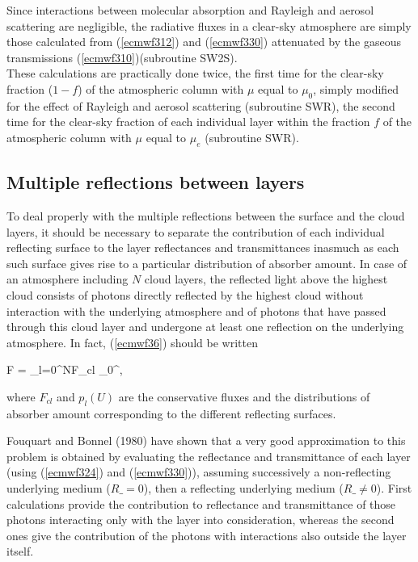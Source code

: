 Since interactions between molecular absorption and Rayleigh and aerosol
scattering are negligible, the radiative fluxes in a clear-sky atmosphere are
simply those calculated from (\ref{ecmwf312}) and (\ref{ecmwf330}) attenuated
by the gaseous transmissions (\ref{ecmwf310})(subroutine SW2S).\\

These calculations are practically done twice, the first time for the clear-sky
fraction ($1-f$) of the atmospheric column with $\mu$ equal to $\mu_0$, simply
modified for the effect of Rayleigh and aerosol scattering (subroutine SWR),
the second time for the clear-sky fraction of each individual layer within the
fraction $f$ of the atmospheric column with $\mu$ equal to $\mu_e$
(subroutine SWR).

%
\subsection{Multiple reflections between layers}
%


To deal properly with the multiple reflections between the surface and the
cloud layers, it should be necessary to separate the contribution of each
individual reflecting surface to the layer reflectances and transmittances
inasmuch as each such surface gives rise to a particular distribution of
absorber amount. In case of an atmosphere including $N$ cloud layers, the
reflected light above the highest cloud consists of photons directly reflected
by the highest cloud without interaction with the underlying atmosphere and of
photons that have passed through this cloud layer and undergone at least one
reflection on the underlying atmosphere. In fact, (\ref{ecmwf36}) should be
written

\medskip
\be
F = \sum_{l=0}^N{F_{cl}} \int_0^{\infty},
\label{ecmwf331}
\ee
\medskip

\noindent where $F_{cl}$ and $p_l(U)$ are the conservative fluxes and the
distributions of absorber amount corresponding to the different reflecting
surfaces.

Fouquart and Bonnel (1980) have shown that a very good approximation to this
problem is obtained by evaluating the reflectance and transmittance of each
layer (using (\ref{ecmwf324}) and (\ref{ecmwf330})), assuming successively a
non-reflecting underlying medium ($R\_ = 0$), then a reflecting underlying
medium ($R\_ \ne 0$). First calculations provide the contribution to reflectance
and transmittance of those photons interacting only with the layer into
consideration, whereas the second ones give the contribution of the photons
with interactions also outside the layer itself.

